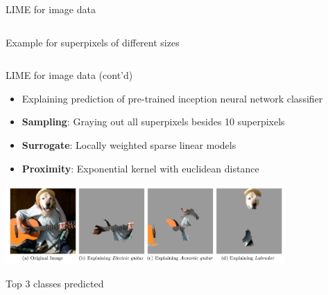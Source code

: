 \documentclass[11pt,compress,t,notes=noshow, aspectratio=169, xcolor=table]{beamer}
\begin{document}
\begin{frame}[c]{LIME for image data}
\begin{columns}[totalwidth=\textwidth]
\begin{column}{0.26\textwidth}
\begin{center}
				{Example for superpixels of different sizes}
			\end{center}
		\end{column}
	\end{columns}
    
\end{frame}
\begin{frame}{LIME for image data (cont'd) }
	\begin{itemize}
		\item Explaining prediction of pre-trained inception neural network classifier
		\item \textbf{Sampling}: Graying out all superpixels besides 10 superpixels
		\item \textbf{Surrogate}: Locally weighted sparse linear models 
		\item \textbf{Proximity}: Exponential kernel with euclidean distance
	\end{itemize}
	\vspace{-0.3cm}
	\begin{center}
		\includegraphics[width=0.8\textwidth]{figure/lime-images}
		
		{Top 3 classes predicted}
	\end{center}
	
\end{frame}
\endlecture
\end{document}
